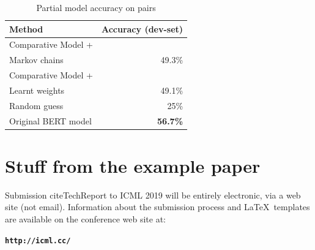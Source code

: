 \documentclass{article}
\begin{document}
\begin{table}[h!]
	\label{tbl:accuracy}
	\vskip 0.15in
	\begin{center}
		\begin{small}
			\begin{sc}
				\begin{tabular}{lr}
					\toprule
					Method	& Accuracy (dev-set)\\
					\midrule
					Comparative Model + \\ \qquad \qquad Markov chains 	& 49.3\% \\
					Comparative Model + \\ \qquad \qquad Learnt weights 	& 49.1\% \\
					\midrule
					Random guess & 25\% \\
					Original BERT model & \textbf{56.7\%} \\
					\bottomrule
				\end{tabular}
			\end{sc}
		\end{small}
	\end{center}
	\vskip -0.1in
	\caption{Partial model accuracy on pairs}
\end{table}

\section{Stuff from the example paper}

Submission cite{TechReport} to ICML 2019 will be entirely electronic, via a web site
(not email). Information about the submission process and \LaTeX\ templates
are available on the conference web site at:
\begin{center}
\textbf{\texttt{http://icml.cc/}}
\end{center}
\end{document}
